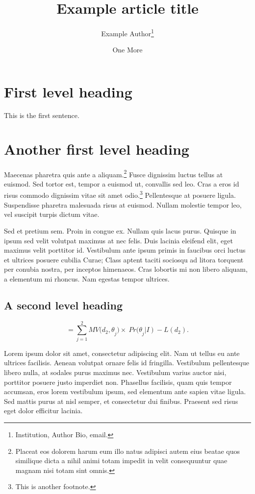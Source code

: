 \documentclass[law]{crclart}
\title{Example article title}
\author{Example Author\thanks{Institution, Author Bio, email.} \and One More}
\begin{document}
\maketitle


\section{First level heading}

This is the first sentence. \lipsum[1]

\section{Another first level heading}

Maecenas pharetra quis ante a aliquam.\footnote{Placeat eos dolorem harum eum
    illo natus adipisci autem eius beatae quos similique dicta a nihil animi totam
    impedit in velit consequuntur quae magnam nisi totam sint omnis.} Fusce
dignissim luctus tellus at euismod. Sed tortor est, tempor a euismod ut,
convallis sed leo. Cras a eros id risus commodo dignissim vitae sit amet
odio.\footnote{This is another footnote. } Pellentesque at posuere ligula.
Suspendisse pharetra malesuada risus at euismod. Nullam molestie tempor leo, vel
suscipit turpis dictum vitae.\cite{Bankowski_Schafer_2007}

Sed et pretium sem. Proin in congue
ex. Nullam quis lacus purus. Quisque in ipsum sed velit
volutpat maximus at nec felis. Duis lacinia eleifend elit, eget maximus velit
porttitor id. Vestibulum ante ipsum primis in faucibus orci luctus et ultrices
posuere cubilia Curae; Class aptent taciti sociosqu ad litora torquent per
conubia nostra, per inceptos himenaeos. Cras lobortis mi non libero aliquam, a
elementum mi rhoncus. Nam egestas tempor ultrices.

\subsection{A second level heading}

$$=\sum_{j=1}^{2}{{MV(d_2,\theta}_j)}\times\
    {Pr(\theta}_j\left|I\right)-L\left(d_2\right).$$

Lorem ipsum dolor sit amet, consectetur adipiscing elit. Nam ut tellus eu ante
ultrices facilisis. Aenean volutpat ornare felis id fringilla. Vestibulum
pellentesque libero nulla, at sodales purus maximus nec. Vestibulum varius
auctor nisi, porttitor posuere justo imperdiet non. Phasellus facilisis, quam
quis tempor accumsan, eros lorem vestibulum ipsum, sed elementum ante sapien
vitae ligula. Sed mattis purus at nisl semper, et consectetur dui finibus.
Praesent sed risus eget dolor efficitur lacinia.
\end{document}
